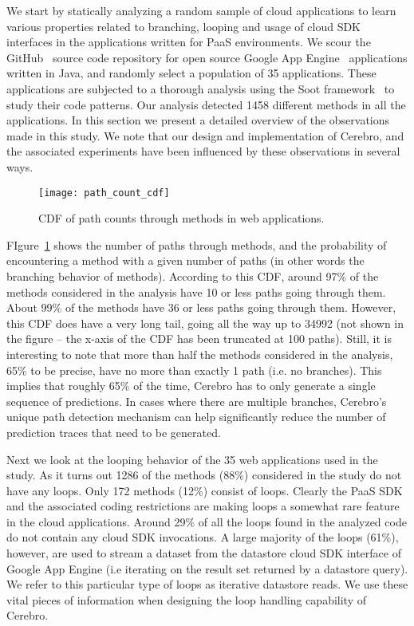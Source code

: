 We start by statically analyzing a random sample of cloud applications to learn various properties related
to branching, looping and usage of cloud SDK interfaces in the applications written for PaaS environments. 
We scour the GitHub~\cite{github} source code repository for open source Google App Engine~\cite{gae} applications written in Java,
and randomly select a population of 35 applications. These applications are subjected to a thorough analysis
using the Soot framework~\cite{Vallee-Rai:2010:SJB:1925805.1925818} to study their code patterns. Our analysis detected 1458 different methods in all the
applications. In this section we present a detailed overview of the observations made in this study. We note that
our design and implementation of Cerebro, and the associated experiments have been influenced by 
these observations in several ways.

\begin{figure}
\centering
\texttt{[image: path\_count\_cdf]}
\caption{CDF of path counts through methods in web applications.}
\label{fig:path_count_cdf}
\end{figure}

FIgure~\ref{fig:path_count_cdf} shows the number of paths through methods, and the probability of encountering
a method with a given number of paths (in other words the branching behavior of methods). According to this CDF, 
around 97\% of the methods considered in the analysis have 10 or less paths going through them. About 99\% of 
the methods have 36 or less paths going through them. However, this CDF does have a very long tail, going all the way
up to 34992 (not shown in the figure -- the x-axis of the CDF has been truncated at 100 paths). Still, it is interesting to note that more
than half the methods considered in the analysis, 65\% to be precise, have no more than exactly 1 path (i.e. no branches).
This implies that roughly 65\% of the time, Cerebro has to only generate a single sequence of predictions. In cases
where there are multiple branches, Cerebro's unique path detection mechanism can help significantly 
reduce the number of prediction traces that need to be generated.

Next we look at the looping behavior of the 35 web applications used in the study. As it turns out 1286 of the methods (88\%)
considered in the study
do not have any loops. Only 172 methods (12\%) consist of loops. Clearly the PaaS SDK and the associated coding restrictions
are making loops a somewhat rare feature in the cloud applications. Around 29\% of all the loops found in 
the analyzed code do not contain any cloud SDK invocations. 
A large majority of the loops (61\%), however, are
used to stream a dataset from the datastore cloud SDK interface of Google App Engine (i.e iterating on the result set 
returned by a datastore query). We refer to this particular type of loops as iterative datastore reads. 
We use these vital pieces of information when designing the loop handling capability of
Cerebro.

